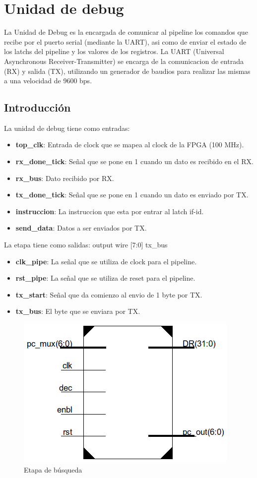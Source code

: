 \section{Unidad de debug}
La Unidad de Debug es la encargada de comunicar al pipeline los comandos que recibe por el puerto serial (mediante la UART), asi como de enviar el estado de los latchs del pipeline y los valores de los registros. La UART (Universal Asynchronous Receiver-Transmitter) se encarga de la comunicacion de entrada (RX) y salida (TX), utilizando un generador de baudios para realizar las mismas a una velocidad de 9600 bps.

\subsection{Introducción}
La unidad de debug tiene como entradas:

\begin{itemize}
  \item \textbf{top\_clk}: Entrada de clock que se mapea al clock de la FPGA (100 MHz). 
  \item \textbf{rx\_done\_tick}: Señal que se pone en 1 cuando un dato es recibido en el RX.
  \item \textbf{rx\_bus}: Dato recibido por RX.
  \item \textbf{tx\_done\_tick}: Señal que se pone en 1 cuando un dato es enviado por TX.
  \item \textbf{instruccion}: La instruccion que esta por entrar al latch if-id.
  \item \textbf{send\_data}: Datos a ser enviados por TX.
\end{itemize} 

La etapa tiene como salidas:
	 output wire [7:0] tx\_bus
\begin{itemize}
	\item \textbf{clk\_pipe}: La señal que se utiliza de clock para el pipeline. 
	\item \textbf{rst\_pipe}: La señal que se utiliza de reset para el pipeline.
	\item \textbf{tx\_start}: Señal que da comienzo al envio de 1 byte por TX. 
	\item \textbf{tx\_bus}: El byte que se enviara por TX.
\end{itemize} 

\begin{figure}[H]
\centering
\includegraphics[scale=0.35]{Capitulo01/fetchstage}
\caption{Etapa de búsqueda}
\label{fig:fetch}
\end{figure}

